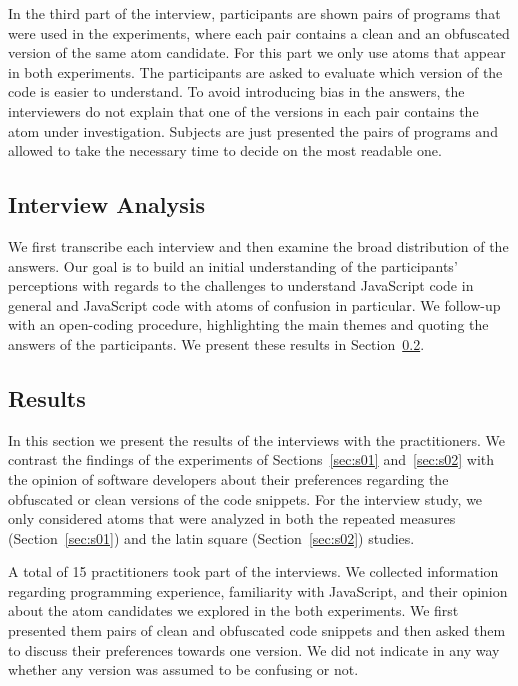 In the third part of the interview, participants are shown pairs of programs that were used in the experiments, where each pair contains a clean and an obfuscated version of the same atom candidate. For this part we only use atoms that appear in both experiments. The participants 
are asked to evaluate which version of the code is easier to understand. To avoid introducing bias in the answers, the interviewers do not explain that one of the versions in each pair contains the atom under investigation. Subjects are just presented the pairs of programs and allowed to take the necessary time to decide on the most readable one.

\subsection{Interview Analysis}

We first transcribe each interview and then examine the broad distribution of the answers. Our goal is to build an initial understanding of the participants' perceptions with regards to the challenges to understand JavaScript code in general and JavaScript code with atoms of confusion in particular. We follow-up with an open-coding procedure, highlighting the main themes and quoting the answers of the participants. We present these results in Section~\ref{sec:interview-results}. 


\subsection{Results}\label{sec:interview-results}

In this section we present the results of the interviews with the practitioners. We contrast the findings of the experiments of Sections~\ref{sec:s01} and~\ref{sec:s02} with the opinion of software developers about their preferences regarding the obfuscated or clean versions of the code snippets. For the interview study, we only considered atoms that were analyzed in both the repeated measures (Section~\ref{sec:s01}) and the latin square (Section~\ref{sec:s02}) studies. 

A total of 15 practitioners took part of the interviews.
We collected information regarding programming
experience, familiarity with JavaScript, and their opinion about the \na atom candidates we explored in the both experiments. We first presented them pairs of clean and obfuscated code snippets and then asked them to discuss their preferences towards one version. We did not indicate in any way whether any version was assumed to be confusing or not. 

